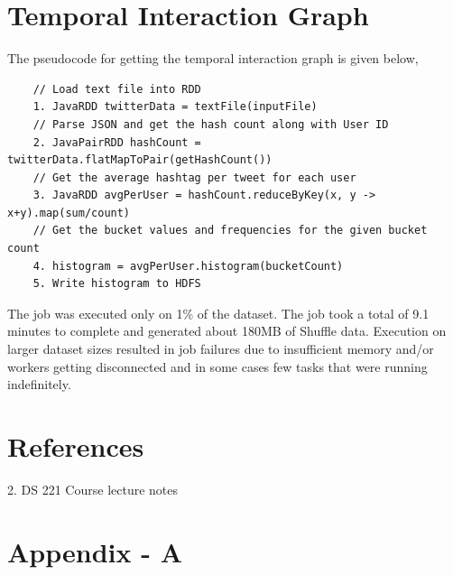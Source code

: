 \documentclass[11pt,a4paper,oneside]{article}
\begin{document}
    \section{Temporal Interaction Graph}
    
    The pseudocode for getting the temporal interaction graph is given below,
    
    \begin{verbatim} 
    // Load text file into RDD
    1. JavaRDD twitterData = textFile(inputFile)
    // Parse JSON and get the hash count along with User ID
    2. JavaPairRDD hashCount = twitterData.flatMapToPair(getHashCount()) 
    // Get the average hashtag per tweet for each user
    3. JavaRDD avgPerUser = hashCount.reduceByKey(x, y -> x+y).map(sum/count)
    // Get the bucket values and frequencies for the given bucket count
    4. histogram = avgPerUser.histogram(bucketCount)
    5. Write histogram to HDFS     
    \end{verbatim}
    
    The job was executed only on 1\% of the dataset. The job took a total of 9.1 minutes to complete and generated about 180MB of Shuffle data. Execution on larger dataset sizes resulted in job failures due to insufficient memory and/or workers getting disconnected and in some cases few tasks that were running indefinitely.   
    
    \section{References}
    \begin{list}{}{}
    	\item 2. DS 221 Course lecture notes
    \end{list}

    \section{Appendix - A}
    
\end{document}
